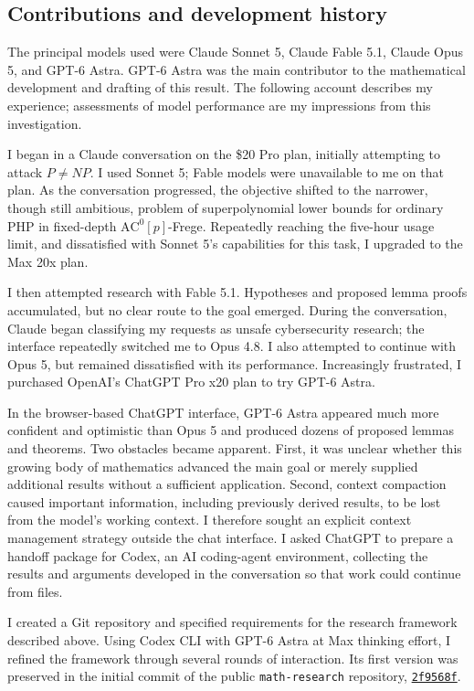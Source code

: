 \subsection{Contributions and development history}\label{sec:model-assistance}
The principal models used were Claude Sonnet 5, Claude Fable 5.1,
Claude Opus 5, and GPT-6 Astra. GPT-6 Astra was the main contributor
to the mathematical development and drafting of this result.
The following account describes my experience; assessments
of model performance are my impressions from this investigation.

I began in a Claude conversation on the
\$20 Pro plan, initially attempting to attack \(P\ne NP\).
I used Sonnet 5; Fable models were unavailable to me on that plan.
As the conversation progressed, the objective shifted to the
narrower, though still ambitious, problem of superpolynomial lower
bounds for ordinary PHP in fixed-depth \(\mathrm{AC}^0[p]\)-Frege.
Repeatedly reaching the five-hour usage limit, and dissatisfied with
Sonnet 5's capabilities for this task, I upgraded to the Max 20x plan.

I then attempted research with Fable 5.1. Hypotheses and proposed
lemma proofs accumulated, but no clear route to the goal emerged.
During the conversation, Claude began classifying my requests as
unsafe cybersecurity research; the interface
repeatedly switched me to Opus 4.8. I also attempted to continue
with Opus 5, but remained dissatisfied with its performance.
Increasingly frustrated, I purchased OpenAI's ChatGPT Pro x20 plan
to try GPT-6 Astra.

In the browser-based ChatGPT interface, GPT-6 Astra appeared much more
confident and optimistic than Opus 5 and produced dozens of proposed
lemmas and theorems. Two obstacles became apparent. First, it was
unclear whether this growing body of mathematics advanced the main
goal or merely supplied additional results without a sufficient
application. Second, context compaction caused important information,
including previously derived results, to be lost from the model's
working context. I therefore sought an explicit context
management strategy outside the chat interface. I asked ChatGPT to
prepare a handoff package for Codex, an AI coding-agent environment,
collecting the results and arguments developed in the conversation
so that work could continue from files.

I created a Git repository and specified requirements for
the research framework described above. Using Codex CLI with
GPT-6 Astra at Max thinking effort, I refined the framework through
several rounds of interaction. Its first version was preserved in
the initial commit of the public \texttt{math-research} repository,
\href{https://github.com/kbr-/math-research/commit/2f9568f}
{\texttt{2f9568f}}.

